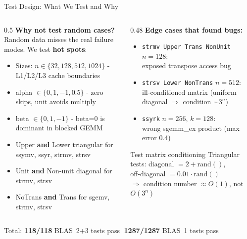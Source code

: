 \documentclass[aspectratio=169,10pt]{beamer}
\begin{document}
\begin{frame}{Test Design: What We Test and Why}
  \begin{columns}[T]
    \begin{column}{0.5\textwidth}
      \textbf{Why not test random cases?}\\
      Random data misses the real failure modes. We test \textbf{hot spots}:
      \begin{itemize}
        \item Sizes: $n \in \{32, 128, 512, 1024\}$ - L1/L2/L3 cache boundaries
        \item alpha $\in \{0, 1, -1, 0.5\}$ - zero skips, unit avoids multiply
        \item beta $\in \{0, 1, -1\}$ - beta=0 is dominant in blocked GEMM
        \item Upper \textbf{and} Lower triangular for ssymv, ssyr, strmv, strsv
        \item Unit \textbf{and} Non-unit diagonal for strmv, strsv
        \item NoTrans \textbf{and} Trans for sgemv, strmv, strsv
      \end{itemize}
    \end{column}
    \begin{column}{0.48\textwidth}
      \textbf{Edge cases that found bugs:}
      \begin{itemize}
        \item \texttt{strmv Upper Trans NonUnit} $n=128$:\\
              exposed transpose access bug
        \item \texttt{strsv Lower NonTrans} $n=512$:\\
              ill-conditioned matrix (uniform diagonal $\Rightarrow$ condition $\sim 3^n$)
        \item \texttt{ssyrk} $n=256$, $k=128$:\\
              wrong sgemm\_ex product (max error 0.4)
      \end{itemize}
      \vspace{0.4em}
      \begin{alertblock}{Test matrix conditioning}
        \scriptsize
        Triangular tests: diagonal $= 2 + \text{rand}()$,\\
        off-diagonal $= 0.01 \cdot \text{rand}()$\\
        $\Rightarrow$ condition number $\approx O(1)$, not $O(3^n)$
      \end{alertblock}
    \end{column}
  \end{columns}
  \vspace{0.2em}
  \centering\footnotesize Total: \textbf{118/118} BLAS~2+3 tests pass \quad|\quad \textbf{1287/1287} BLAS~1 tests pass
\end{frame}
\end{document}

